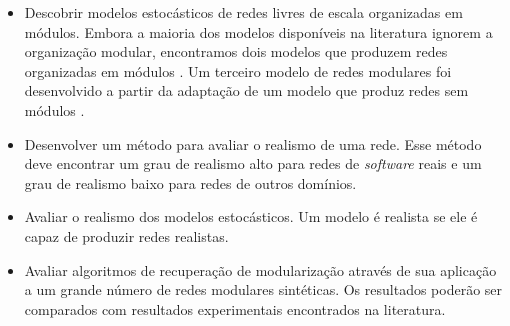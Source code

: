 \documentclass[12pt]{article}
\begin{document}
\begin{itemize}

\item Descobrir modelos estocásticos de redes livres de escala organizadas em
módulos. Embora a maioria dos modelos disponíveis na literatura ignorem a
organização modular, encontramos dois modelos que produzem redes organizadas em
módulos \cite{Chen2008,Lancichinetti2009}. Um terceiro modelo de redes modulares
foi desenvolvido a partir da adaptação de um modelo que produz redes sem módulos
\cite{Bollobas2003}.


\item Desenvolver um método para avaliar o realismo de uma rede. Esse método
deve encontrar um grau de realismo alto para redes de \emph{software} reais e um
grau de realismo baixo para redes de outros domínios. %

\item Avaliar o realismo dos modelos estocásticos. Um modelo é realista se ele é
capaz de produzir redes realistas.

\item Avaliar algoritmos de recuperação de modularização através de sua
aplicação a um grande número de redes modulares sintéticas. Os resultados
poderão ser comparados com resultados experimentais encontrados na literatura.

\end{itemize}




\end{document}
